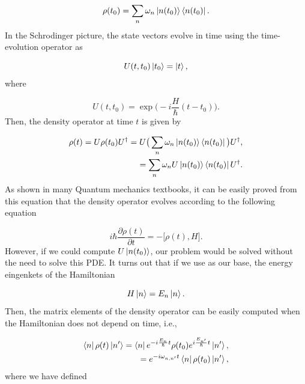 \documentclass{article}
\begin{document}
\begin{equation}
    \rho(t_{0}) = \sum_{n} \omega_{n} \ket{n(t_{0})}\bra{n(t_{0})}.
\end{equation}
%
In the Schrodinger picture, the state vectors evolve in time using the time-evolution operator as

\begin{equation}
    U(t, t_{0}) \ket{t_{0}} = \ket{t},
\end{equation}
%
where

\begin{equation}
    U(t,t_{0}) = \exp \bigg( -i \frac{H}{\hbar} (t-t_{0}) \bigg).
\end{equation}
%
Then, the density operator at time $t$ is given by

\begin{equation}
    \begin{split}
        \rho(t) = U \rho(t_{0}) U^{\dagger} = U \big( \sum_{n} \omega_{n} \ket{n(t_{0})}\bra{n(t_{0})} \big) U^{\dagger}, \\ = \sum_{n} \omega_{n} U \ket{n(t_{0})}\bra{n(t_{0})} U^{\dagger}. 
    \end{split}
\end{equation}
%
As shown in many Quantum mechanics textbooks, it can be easily proved from this equation that the density operator evolves according to the following equation

\begin{equation}
    i\hbar \frac{\partial \rho(t)}{\partial t} = - \big[\rho(t), H \big].
\end{equation}
%
However, if we could compute $U \ket{n(t_{0})}$, our problem would be solved without the need to solve this PDE. It turns out that if we use as our base, the energy eingenkets of the Hamiltonian

\begin{equation}
    H \ket{n} = E_{n} \ket{n}.
\end{equation}
%
Then, the matrix elements of the density operator can be easily computed when the Hamiltonian does not depend on time, i.e.,

\begin{equation}\label{time_evol_density_h_independent_time}
   \begin{split}
       \bra{n} \rho(t) \ket{n'} = \bra{n} e^{-i\frac{E_{n}}{\hbar} t} \rho(t_{0}) e^{i\frac{E_{n'}}{\hbar} t} \ket{n'}, \\ = e^{-i \omega_{n,n'} t} \bra{n} \rho(t_{0}) \ket{n'},
   \end{split}
\end{equation}
%
where we have defined
\end{document}
